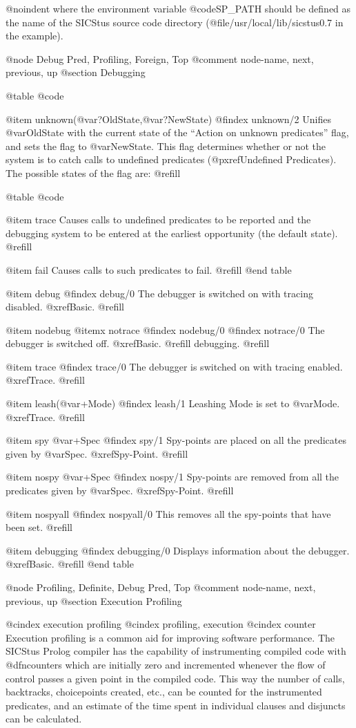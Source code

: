 @noindent
where the environment variable @code{SP_PATH} should be defined as the
name of the SICStus source code directory
(@file{/usr/local/lib/sicstus0.7} in the example).

@node Debug Pred, Profiling, Foreign, Top
@comment  node-name,  next,  previous,  up
@section Debugging

@table @code

@item unknown(@var{?OldState},@var{?NewState})
@findex unknown/2
Unifies @var{OldState} with the current state of the ``Action on unknown
predicates'' flag, and sets the flag to @var{NewState}.  This flag
determines whether or not the system is to catch calls to undefined
predicates (@pxref{Undefined Predicates}).  The possible states of the
flag are: @refill

@table @code

@item trace
Causes calls to undefined predicates to be reported and the debugging
system to be entered at the earliest opportunity (the default state).
@refill

@item fail
Causes calls to such predicates to fail. @refill
@end table

@item debug
@findex debug/0
The debugger is switched on with tracing disabled. @xref{Basic}. @refill

@item nodebug
@itemx notrace
@findex nodebug/0
@findex notrace/0
The debugger is switched off. @xref{Basic}. @refill
debugging. @refill

@item trace
@findex trace/0
The debugger is switched on with tracing enabled. @xref{Trace}. @refill

@item leash(@var{+Mode})
@findex leash/1
Leashing Mode is set to @var{Mode}.  @xref{Trace}. @refill

@item spy @var{+Spec}
@findex spy/1
Spy-points are placed on all the predicates given by @var{Spec}.
@xref{Spy-Point}. @refill

@item nospy @var{+Spec}
@findex nospy/1
Spy-points are removed from all the predicates given by @var{Spec}.
@xref{Spy-Point}. @refill

@item nospyall
@findex nospyall/0
This removes all the spy-points that have been set. @refill

@item debugging
@findex debugging/0
Displays information about the debugger.  @xref{Basic}.  @refill
@end table

@node Profiling, Definite, Debug Pred, Top
@comment  node-name,  next,  previous,  up
@section Execution Profiling

@cindex execution profiling
@cindex profiling, execution
@cindex counter
Execution profiling is a common aid for improving software performance.
The SICStus Prolog compiler has the capability of instrumenting compiled
code with @dfn{counters} which are initially zero and incremented
whenever the flow of control passes a given point in the compiled code.
This way the number of calls, backtracks, choicepoints created, etc.,
can be counted for the instrumented predicates, and an estimate of the
time spent in individual clauses and disjuncts can be calculated.

